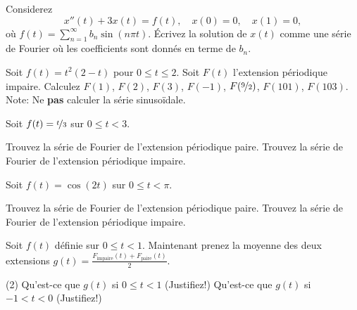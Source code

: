 \begin{exercise}
Considerez
\begin{equation*}
x''(t) + 3 x(t) = f(t) , \quad x(0) = 0, \quad x(1) = 0,
\end{equation*}
où $f(t) = \sum_{n=1}^\infty b_n \sin (n \pi t)$.  Écrivez la solution de $x(t)$
comme une série de Fourier où les coefficients sont donnés en terme de $b_n$.
\end{exercise}

\begin{exercise}
Soit $f(t) = t^2(2-t)$ pour $0 \leq t \leq 2$.  Soit $F(t)$ l'extension périodique impaire.  Calculez $F(1)$, $F(2)$, $F(3)$, $F(-1)$, $F(\nicefrac{9}{2})$,
$F(101)$, $F(103)$.  Note: Ne \textbf{pas} calculer la série sinusoïdale. 
\end{exercise}

\setcounter{exercise}{100}

\begin{exercise}
Soit $f(t) = \nicefrac{t}{3}$ sur $0 \leq t < 3$.
\begin{tasks}
\task Trouvez la série de Fourier de l'extension périodique paire.
\task Trouvez la série de Fourier de l'extension périodique impaire.
\end{tasks}
\end{exercise}

\begin{exercise}
Soit $f(t) = \cos(2t)$ sur $0 \leq t < \pi$.
\begin{tasks}
\task Trouvez la série de Fourier de l'extension périodique paire.
\task Trouvez la série de Fourier de l'extension périodique impaire.
\end{tasks}
\end{exercise}

\begin{exercise}
Soit $f(t)$ définie sur $0 \leq t < 1$.  Maintenant prenez
la moyenne des deux extensions
$g(t) = \frac{F_{\text{impaire}}(t)+ F_{\text{paire}}(t)}{2}$.
\begin{tasks}(2)
\task Qu'est-ce que $g(t)$ si $0 \leq t < 1$ (Justifiez!)
\task Qu'est-ce que $g(t)$ si $-1 < t < 0$ (Justifiez!)
\end{tasks}
\end{exercise}

